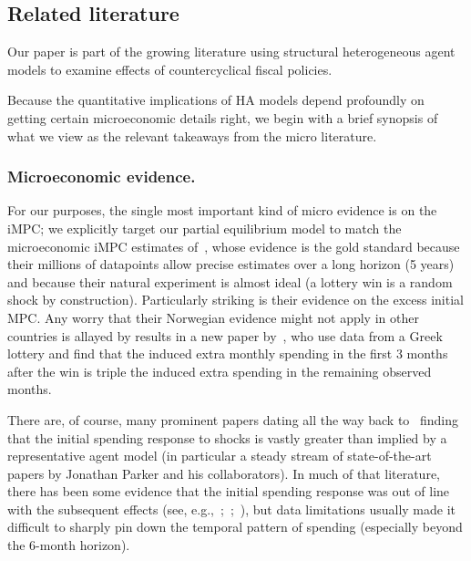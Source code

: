 \documentclass[\latexroot/\projectname]{subfiles}
\begin{document}
\whenintegrated{\label{microeconomic-literature}}\par\subsection{Related literature}
\whenintegrated{\label{sec:microlit}} %

Our paper is part of the growing literature using structural heterogeneous agent models to examine effects of countercyclical fiscal policies.

Because the quantitative implications of HA models depend profoundly on getting certain microeconomic details right, we begin with a brief synopsis of what we view as the relevant takeaways from the micro literature.

\whenintegrated{\label{microeconomic-evidence}}
\subsubsection{Microeconomic evidence.}
For our purposes, the single most important kind of micro evidence is on the iMPC; we explicitly target our partial equilibrium model to match the microeconomic iMPC estimates of~\cite{fagereng-mpc-2021}, whose evidence is the gold standard because their millions of datapoints allow precise estimates over a long horizon (5 years) and because their natural experiment is almost ideal (a lottery win is a random shock by construction).  Particularly striking is their evidence on the excess initial MPC.  Any worry that their Norwegian evidence might not apply in other countries is allayed by results in a new paper by~\cite{kotsogiannisMPCs}, who use data from a Greek lottery and find that the induced extra monthly spending in the first 3 months after the win is triple the induced extra spending in the remaining observed months.

There are, of course, many prominent papers dating all the way back to~\cite{friedmanWindfalls} finding that the initial spending response to shocks is vastly greater than implied by a representative agent model (in particular a steady stream of state-of-the-art papers by Jonathan Parker and his collaborators). In much of that literature, there has been some evidence that the initial spending response was out of line with the subsequent effects (see, e.g.,~\cite{parker2013consumer};~\cite{broda2014economic};~\cite{jpsTax}), but data limitations usually made it difficult to sharply pin down the temporal pattern of spending (especially beyond the 6-month horizon).
\end{document}

